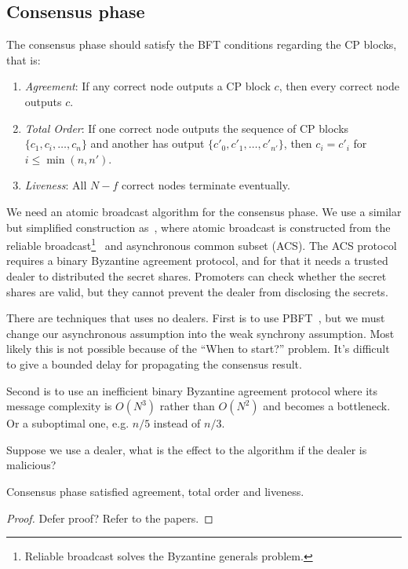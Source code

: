 \subsection{Consensus phase}
The consensus phase should satisfy the BFT conditions regarding the CP blocks,
that is:
\begin{enumerate}
\item \emph{Agreement}: If any correct node outputs a CP block $c$, then every
  correct node outputs $c$.
\item \emph{Total Order}: If one correct node outputs the sequence of CP blocks
  $\{c_1, c_i, \dots, c_n\}$ and another has output $\{c'_0, c'_1, \dots,
  c'_{n'} \}$, then $c_i = c'_i$ for $i \le \min(n, n')$.
\item \emph{Liveness}: All $N - f$ correct nodes terminate eventually.
\end{enumerate}

We need an atomic broadcast algorithm for the consensus phase. We use a similar
but simplified construction as~\cite{miller2016honey}, where atomic broadcast is
constructed from the reliable broadcast\footnote{Reliable broadcast solves the
  Byzantine generals problem.}~\cite{bracha1984asynchronous} and asynchronous
common subset (ACS). The ACS protocol requires a binary Byzantine agreement
protocol, and for that it needs a trusted dealer to distributed the secret
shares. Promoters can check whether the secret shares are valid, but they cannot
prevent the dealer from disclosing the secrets.

There are techniques that uses no dealers. First is to use
PBFT~\cite{castro1999practical}, but we must change our asynchronous assumption
into the weak synchrony assumption. Most likely this is not possible because of
the ``When to start?'' problem. It's difficult to give a bounded delay for
propagating the consensus result.

Second is to use an inefficient binary Byzantine agreement protocol where its
message complexity is $O(N^3)$ rather than $O(N^2)$ and becomes a bottleneck. Or
a suboptimal one, e.g. $n/5$ instead of $n/3$.

Suppose we use a dealer, what is the effect to the algorithm if the dealer is
malicious?

\begin{lemma}
  Consensus phase satisfied agreement, total order and liveness.
\end{lemma}
\begin{proof}
  Defer proof? Refer to the papers.
\end{proof}

